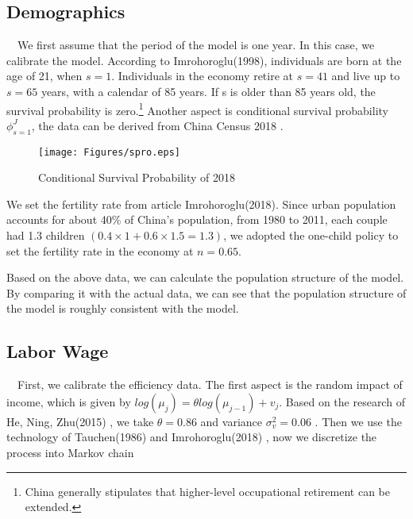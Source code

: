 \documentclass{article}
\begin{document}
    \subsection{Demographics}
        ~\
        We first assume that the period of the model is one year. In this case, we calibrate the model. According to Imrohoroglu(1998), individuals are born at the age of 21, when $s = 1$. Individuals in the economy retire at $s=41$ and live up to $s = 65$ years, with a calendar of 85 years. If s is older than 85 years old, the survival probability is zero.\footnote{China generally stipulates that higher-level occupational retirement can be extended.}
        Another aspect is conditional survival probability ${\phi}_{s=1}^J$, the data can be derived from China Census 2018 .
        \begin{figure}[H]
            \centering
            \texttt{[image: Figures/spro.eps]}
            \caption{Conditional Survival Probability of 2018}
        \end{figure}
        
        We set the fertility rate from article Imrohoroglu(2018). Since urban population accounts for about 40\% of China's population, from 1980 to 2011, each couple had 1.3 children $(0.4\times1+0.6\times1.5=1.3)$, we adopted the one-child policy to set the fertility rate in the economy at $n=0.65$.
        
        
        Based on the above data, we can calculate the population structure of the model. By comparing it with the actual data, we can see that the population structure of the model is roughly consistent with the model.
    \subsection{Labor Wage}
        ~\
        First, we calibrate the efficiency data. The first aspect is the random impact of income, which is given by $log(\mu_j)=\theta log(\mu_{j-1})+v_j$.
        Based on the research of He, Ning, Zhu(2015) , we take $\theta=0.86$ and variance $\sigma_v^2=0.06$ . 
        Then we use the technology of Tauchen(1986) and Imrohoroglu(2018) , now we discretize the process into Markov chain 
\end{document}
